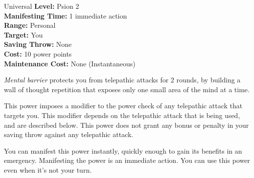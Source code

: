 {Universal}
{
	\textbf{Level:}
	Psion 2\\
	\textbf{Manifesting Time:}
	1 immediate action\\
	\textbf{Range:}
	Personal\\
	\textbf{Target:}
	You\\
	\textbf{Saving Throw:}
	None\\
	\textbf{Cost:}
	10 power points\\
	\textbf{Maintenance Cost:}
	None (Instantaneous)\\
}
{
	\emph{Mental barrier} protects you from telepathic attacks for 2 rounds, by building a wall of thought repetition that exposes only one small area of the mind at a time.

	This power imposes a modifier to the power check of any telepathic attack that targets you. This modifier depends on the telepathic attack that is being used, and are described below. This power does not grant any bonus or penalty in your saving throw against any telepathic attack.


	You can manifest this power instantly, quickly enough to gain its benefits in an emergency. Manifesting the power is an immediate action. You can use this power even when it's not your turn.
}